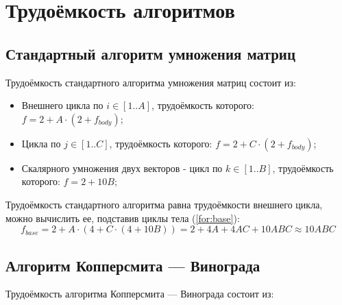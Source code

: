 \section{Трудоёмкость алгоритмов}

\subsection{Стандартный алгоритм умножения матриц}

Трудоёмкость стандартного алгоритма умножения матриц состоит из:
\begin{itemize}
    \item Внешнего цикла по $i \in [1..A]$, трудоёмкость которого: $f = 2 + A \cdot (2 + f_{body})$;
    \item Цикла по $j \in [1..C]$, трудоёмкость которого: $f = 2 + C \cdot (2 + f_{body})$;
    \item Скалярного умножения двух векторов - цикл по $k \in [1..B]$, трудоёмкость которого: $f = 2 + 10B$;
\end{itemize}

Трудоёмкость стандартного алгоритма равна трудоёмкости внешнего цикла, можно вычислить ее, подставив циклы тела (\ref{for:base}):
\begin{equation}
    \label{for:base}
    f_{base} = 2 + A \cdot (4 + C \cdot (4 + 10B)) = 2 + 4A + 4AC + 10ABC \approx 10ABC
\end{equation}

\subsection{Алгоритм Копперсмита — Винограда}

Трудоёмкость алгоритма Копперсмита — Винограда состоит из:

